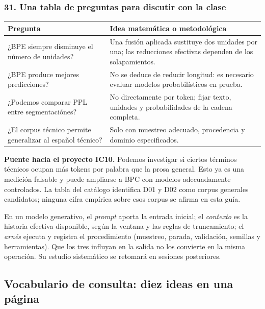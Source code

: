 \subsubsection*{31. Una tabla de preguntas para discutir con la clase}
\begin{center}
\begin{tabularx}{\textwidth}{p{55mm}X}\toprule
Pregunta & Idea matemática o metodológica\\\midrule
¿BPE siempre disminuye el número de unidades? & Una fusión aplicada sustituye dos unidades por una; las reducciones efectivas dependen de los solapamientos.\\
¿BPE produce mejores predicciones? & No se deduce de reducir longitud: es necesario evaluar modelos probabilísticos en prueba.\\
¿Podemos comparar PPL entre segmentaciónes? & No directamente por token; fijar texto, unidades y probabilidades de la cadena completa.\\
¿El corpus técnico permite generalizar al español técnico? & Solo con muestreo adecuado, procedencia y dominio especificados.\\\bottomrule
\end{tabularx}
\end{center}
\textbf{Puente hacia el proyecto IC10.} Podemos investigar si ciertos términos técnicos ocupan más tokens por palabra que la prosa general. Esto ya es una medición falsable y puede ampliarse a BPC con modelos adecuadamente controlados. La tabla del catálogo identifica D01 y D02 como corpus generales candidatos; ninguna cifra empírica sobre esos corpus se afirma en esta guía.
\begin{idea}
En un modelo generativo, el \emph{prompt} aporta la entrada inicial; el \emph{contexto} es la historia efectiva disponible, según la ventana y las reglas de truncamiento; el \emph{arnés} ejecuta y registra el procedimiento (muestreo, parada, validación, semillas y herramientas). Que los tres influyan en la salida no los convierte en la misma operación. Su estudio sistemático se retomará en sesiones posteriores.
\end{idea}
\clearpage



\subsection{Vocabulario de consulta: diez ideas en una página}

